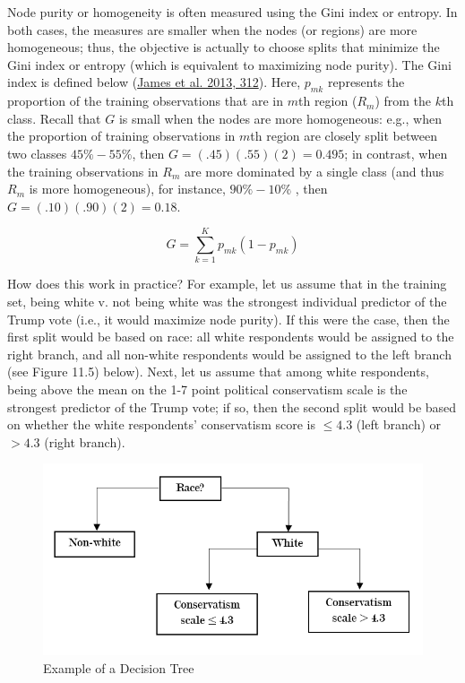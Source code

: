 \documentclass{book}
\begin{document}
Node purity or homogeneity is often measured using the Gini index or entropy.
In both cases, the measures are smaller when the nodes (or regions) are more
homogeneous; thus, the objective is actually to choose splits that minimize
the Gini index or entropy (which is equivalent to maximizing node purity). The
Gini index is defined below (\protect\hyperlink{ref-james2013a}{James et al.
2013, 312}). Here, \(p_{mk}\) represents the proportion of the training
observations that are in \(m\)th region (\(R_{m}\)) from the \(k\)th class.
Recall that \(G\) is small when the nodes are more homogeneous: e.g., when the
proportion of training observations in \(m\)th region are closely split
between two classes \(45\% -55\%\), then \(G = (.45)(.55)(2) =0.495\); in
contrast, when the training observations in \(R_{m}\) are more dominated by a
single class (and thus \(R_{m}\) is more homogeneous), for instance,
\(90\% -10\%\) , then \(G = (.10)(.90)(2) = 0.18\).

\[G= \sum _{k=1}^{K}p_{mk} \left( 1-p_{mk} \right)\]

How does this work in practice? For example, let us assume that in the
training set, being white v. not being white was the strongest individual
predictor of the Trump vote (i.e., it would maximize node purity). If this
were the case, then the first split would be based on race: all white
respondents would be assigned to the right branch, and all non-white
respondents would be assigned to the left branch (see Figure 11.5) below).
Next, let us assume that among white respondents, being above the mean on the
1-7 point political conservatism scale is the strongest predictor of the Trump
vote; if so, then the second split would be based on whether the white
respondents' conservatism score is \(\leq 4.3\) (left branch) or \(> 4.3\)
(right branch).

\begin{figure}
\centering
\includegraphics{images/ml/jl-figure5.png}
\caption{Example of a Decision Tree}
\end{figure}
\end{document}
